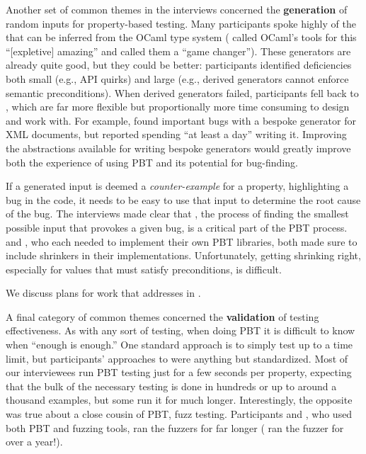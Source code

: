 \smallskip

Another set of common themes in the interviews concerned the {\bf generation} of
random inputs for property-based testing. Many participants spoke
highly of the  that can be inferred from
the OCaml type system ( called OCaml's tools for this
``[expletive] amazing'' and  called them a ``game changer'').
These generators are already quite good, but they could be better: participants
identified deficiencies both small (e.g., API quirks) and large (e.g.,
derived generators 
cannot enforce semantic preconditions). When derived generators
failed, participants fell back to , which
are far more flexible but proportionally more time consuming to design and work
with. For example,  found important bugs with a bespoke
generator for XML documents, 
but reported spending ``at least a day'' writing it. 
Improving the abstractions available for writing bespoke generators would
greatly improve both the experience of using PBT and its potential for
bug-finding.

If a generated input is deemed a {\em counter-example} for a property,
highlighting a bug in the code, it needs to be easy to use that input to
determine the root cause of the bug. The interviews made clear that
, the process of finding the smallest possible input that
provokes a given bug, is a critical part of the PBT process.  
and , who each needed to implement their own PBT libraries, both
made sure to include shrinkers in their implementations. Unfortunately, getting
shrinking right, especially for values that must satisfy preconditions, is
difficult.

We discuss plans for work that addresses  in .

\smallskip

A final category of common themes concerned the {\bf validation} of testing
effectiveness. As with any sort of testing, when doing PBT it is difficult to
know when ``enough is enough.'' One standard approach is to simply test up to a
time limit, but participants' approaches to 
were anything but standardized.
Most of our interviewees run PBT testing just for a few seconds per property,
expecting that the bulk of the necessary testing is done in hundreds or up to
around a thousand examples, but some run it for much longer.
Interestingly, the opposite was true about a close cousin of PBT, fuzz testing.
Participants  and , who used both PBT and
fuzzing tools, ran the fuzzers for far longer
( ran the fuzzer for over a year!).

